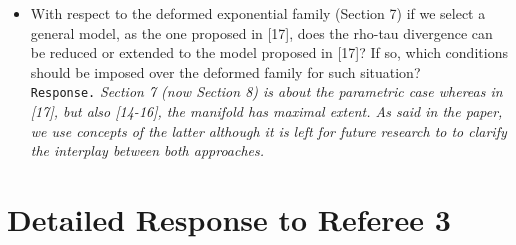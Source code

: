 \documentclass[a4paper,12pt]{article}
\begin{document}
\begin{itemize}
\item With respect to the deformed exponential family (Section 7) if we select
a general model, as the one proposed in [17], does the rho-tau divergence
can be reduced or extended to the model proposed in [17]? If so, which
conditions should be imposed over the deformed family for such situation? \\
{\tt Response.} {\it Section 7 (now Section 8) is about the parametric case
 whereas in [17], but also [14-16], the manifold has maximal extent.
 As said in the paper, we use concepts of the latter although it is left for future research to to clarify the interplay between both approaches.}
 
   \end{itemize}

\section{Detailed Response to Referee 3}
\end{document}

